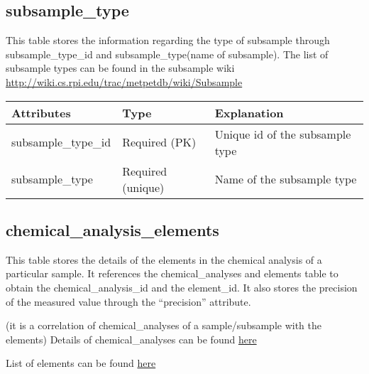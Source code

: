 \documentclass[letterpaper,10pt,english]{sphinxmanual}
\begin{document}
\subsection{subsample\_type}
\label{Table_Description:subsample-type}
This table stores the information regarding the type of subsample through subsample\_type\_id and subsample\_type(name of subsample). The list of subsample types can be found in the subsample wiki
\href{http://wiki.cs.rpi.edu/trac/metpetdb/wiki/Subsample}{http://wiki.cs.rpi.edu/trac/metpetdb/wiki/Subsample}

\begin{tabulary}{\linewidth}{|L|L|L|}
\hline
\textbf{
Attributes
} & \textbf{
Type
} & \textbf{
Explanation
}\\\hline

subsample\_type\_id
 & 
Required (PK)
 & 
Unique id of the subsample type
\\\hline

subsample\_type
 & 
Required (unique)
 & 
Name of the subsample type
\\\hline
\end{tabulary}



\subsection{chemical\_analysis\_elements}
\label{Table_Description:chemical-analysis-elements}
This table stores the details of the elements in the chemical analysis of a particular sample. It references the chemical\_analyses and elements table to obtain the chemical\_analysis\_id and the element\_id. It also stores the precision of the measured value through the “precision” attribute.

(it is a correlation of chemical\_analyses of a sample/subsample with the elements)
Details of chemical\_analyses can be found \href{http://wiki.cs.rpi.edu/trac/metpetdb/wiki/ChemicalAnalysisObject}{here}

List of elements can be found \href{http://wiki.cs.rpi.edu/trac/metpetdb/wiki/Element}{here}
\end{document}
